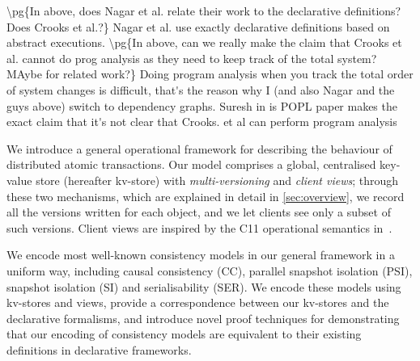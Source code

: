 \ac{
\pg{In above, does Nagar et al.  relate their work to the declarative
  definitions?
Does Crooks et al.?}
Nagar et al. use exactly declarative definitions based on abstract executions.
}
\ac{
\pg{In above, can we really make the claim that Crooks et al. cannot
  do prog analysis as  they need to keep track of the total system?
  MAybe for related work?}
Doing program analysis when you track the total order of system changes 
is difficult, that's the reason why I (and also Nagar and the guys above) switch 
to dependency graphs. Suresh in is POPL paper makes the exact claim that 
it's not clear that Crooks. et al can perform program analysis 
}


We introduce a general operational framework for describing the
behaviour of distributed {atomic} transactions. 
Our model comprises a global, centralised
key-value store (hereafter kv-store) with {\em multi-versioning} and {\em client views}; 
through these two mechanisms, which  are explained in detail in \cref{sec:overview}, 
we record all the versions written for each object, and we let clients see only a subset 
of such versions.
Client views are inspired by the C11 operational semantics in~\cite{promises}.


We encode most well-known consistency models in our general framework in a uniform way, including causal consistency (CC), parallel snapshot isolation
(PSI), snapshot isolation (SI) and serialisability (SER). 
We encode these models using kv-stores and views, 
provide a correspondence between our kv-stores and the declarative formalisms, 
and introduce novel proof techniques for demonstrating that our encoding of consistency models 
are equivalent to their existing definitions in declarative frameworks.
%
%

